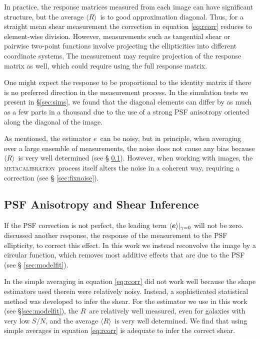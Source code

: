 \documentclass[iop]{emulateapj}
\newcommand{\snr}{$S/N$}
\newcommand{\vest}{\mbox{\boldmath $e$}}
\newcommand{\mcal}{\textsc{metacalibration}}
\newcommand{\mcalR}{\mbox{\boldmath $R$}}
\newcommand{\mcalRmean}{\mbox{\boldmath $\langle R \rangle$}}
\begin{document}
In practice, the response matrices measured from each image can have
significant structure, but the average \mcalRmean\ is to good approximation
diagonal.  Thus, for a straight mean shear measurement the correction in
equation \ref{eq:rcorr} reduces to element-wise division.  However,
measurements such as tangential shear or pairwise two-point functions involve
projecting the ellipticities into different coordinate systems. The measurement
may require projection of the response matrix as well, which could require
using the full response matrix.

One might expect the response to be proportional to the identity matrix if
there is no preferred direction in the measurement process.  In the simulation
tests we present in \S \ref{sec:sims}, we found that the diagonal elements can
differ by as much as a few parts in a thousand due to the use of a strong PSF
anisotropy oriented along the diagonal of the image.

As mentioned, the estimator \vest\ can be noisy, but in principle, when
averaging over a large ensemble of measurements, the noise does not cause any
bias because \mcalRmean\ is very well determined (see \S
\ref{sec:differences}).  However, when working with images, the \mcal\ process
itself alters the noise in a coherent way, requiring a correction (see \S
\ref{sec:fixnoise}).


\subsection{PSF Anisotropy and Shear Inference}  \label{sec:differences}

If the PSF correction is not perfect, the leading term $\langle \vest
\rangle|_{\gamma=0}$ will not be zero.  \cite{HuffMcal} discussed another
response, the response of the measurement to the PSF ellipticity, to correct
this effect.  In this work we instead reconvolve the image by a circular
function, which removes most additive effects that are due to the PSF  (see \S
\ref{sec:modelfit}).

In \cite{HuffMcal} the simple averaging in equation \ref{eq:rcorr} did not work
well because the shape estimators used  therein were relatively noisy.
Instead, a sophisticated statistical method was developed to infer the shear.
For the estimator we use in this work (see \S \ref{sec:modelfit}), the \mcalR\
are relatively well measured, even for galaxies with very low \snr, and the average
\mcalRmean\ is very well determined. We find that using simple averages in
equation \ref{eq:rcorr} is adequate to infer the correct shear. 
\end{document}
